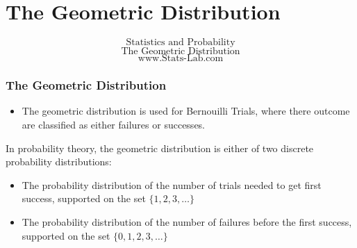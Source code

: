 \documentclass[12pt]{beamer}
\begin{document}
\section{The Geometric Distribution}
\begin{frame}
\huge
\[ \mbox{Statistics and Probability} \]
\huge
\[ \mbox{The Geometric Distribution} \]
\Large
\[ \mbox{www.Stats-Lab.com} \]

\end{frame}
\begin{frame}
\frametitle{The Geometric Distribution}
\Large
\begin{itemize}
\item The geometric distribution is used for Bernouilli Trials, where there outcome are classified as either failures or successes.
\end{itemize} \bigskip

In probability theory, the geometric distribution is either of two discrete probability distributions:
\begin{itemize}
\item The probability distribution of the number of trials needed to get first success, supported on the set $\{ 1, 2, 3, \ldots\}$
\item The probability distribution of the number of failures before the first success, supported on the set $\{ 0, 1, 2, 3, \ldots\}$
\end{itemize}
\end{frame}
\end{document}

